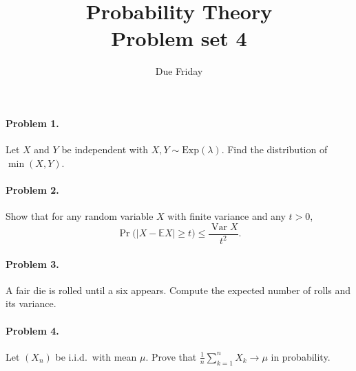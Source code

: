 \documentclass[11pt]{article}
\title{Probability Theory\\\large Problem set 4}
\author{Due Friday}
\date{}
\begin{document}
\maketitle

\paragraph{Problem 1.} Let $X$ and $Y$ be independent with
$X, Y \sim \mathrm{Exp}(\lambda)$. Find the distribution of $\min(X, Y)$.

\paragraph{Problem 2.} Show that for any random variable $X$ with finite
variance and any $t > 0$,
\[
  \Pr\bigl(|X - \mathbb{E}X| \ge t\bigr) \le \frac{\operatorname{Var} X}{t^2}.
\]

\paragraph{Problem 3.} A fair die is rolled until a six appears. Compute the
expected number of rolls and its variance.

\paragraph{Problem 4.} Let $(X_n)$ be i.i.d.\ with mean $\mu$. Prove that
$\frac{1}{n}\sum_{k=1}^{n} X_k \to \mu$ in probability.
\end{document}
